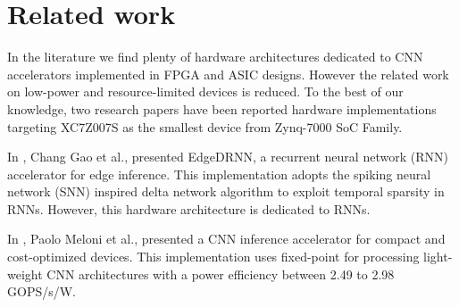 \section{Related work}
\label{sec:related_work}
In the literature we find plenty of hardware architectures
dedicated to CNN accelerators implemented in FPGA and ASIC designs. However the related work on low-power and resource-limited devices is reduced. To the best of our knowledge, two research papers have been reported hardware implementations targeting XC7Z007S as the smallest device from Zynq-7000 SoC Family.

In \cite{gao2020edgedrnn}, Chang Gao et al., presented EdgeDRNN, a recurrent neural network (RNN) accelerator for edge inference. This implementation adopts the spiking neural network (SNN) inspired delta network algorithm to exploit temporal sparsity in RNNs. However, this hardware architecture is dedicated to RNNs.

In \cite{meloni2019cnn}, Paolo Meloni et al., presented a CNN inference accelerator for compact and cost-optimized devices. This implementation uses fixed-point for processing light-weight CNN architectures with a power efficiency between 2.49 to 2.98 GOPS/s/W.